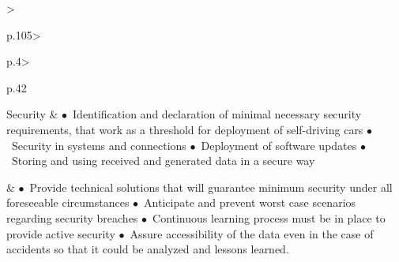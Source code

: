 \begin{table}[t]
\begin{small}
\begin{supertabular}{%
		>{\raggedright}p{.105\textwidth}>{\raggedright}p{.4\textwidth}>{\raggedright}p{.42\textwidth}}
 			 \tabularnewline \hline %
			Security & 
					\noindent $\bullet$~Identification and declaration of minimal necessary security requirements, that work as a threshold for deployment of self-driving cars %
					\noindent $\bullet$~Security in systems and connections %
					\noindent $\bullet$~Deployment of software updates %
					\noindent $\bullet$~Storing and using received and generated data in a secure way %
					
			& 
					\noindent $\bullet$~Provide technical solutions that will guarantee minimum security under all foreseeable circumstances
					\noindent $\bullet$~Anticipate and prevent worst case scenarios regarding security breaches
					\noindent $\bullet$~Continuous learning process must be in place to provide active security
					\noindent $\bullet$~Assure accessibility of the data even in the case of accidents so that it could be analyzed and lessons learned.%
					  

\end{supertabular}
\end{small}
\end{table}
